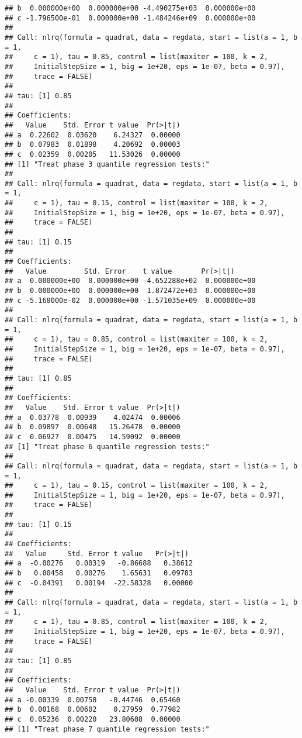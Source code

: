 \documentclass[
]{article}
\begin{document}
\begin{verbatim}
## b  0.000000e+00  0.000000e+00 -4.490275e+03  0.000000e+00
## c -1.796500e-01  0.000000e+00 -1.484246e+09  0.000000e+00
## 
## Call: nlrq(formula = quadrat, data = regdata, start = list(a = 1, b = 1, 
##     c = 1), tau = 0.85, control = list(maxiter = 100, k = 2, 
##     InitialStepSize = 1, big = 1e+20, eps = 1e-07, beta = 0.97), 
##     trace = FALSE)
## 
## tau: [1] 0.85
## 
## Coefficients:
##   Value    Std. Error t value  Pr(>|t|)
## a  0.22602  0.03620    6.24327  0.00000
## b  0.07983  0.01898    4.20692  0.00003
## c  0.02359  0.00205   11.53026  0.00000
## [1] "Treat phase 3 quantile regression tests:"
## 
## Call: nlrq(formula = quadrat, data = regdata, start = list(a = 1, b = 1, 
##     c = 1), tau = 0.15, control = list(maxiter = 100, k = 2, 
##     InitialStepSize = 1, big = 1e+20, eps = 1e-07, beta = 0.97), 
##     trace = FALSE)
## 
## tau: [1] 0.15
## 
## Coefficients:
##   Value         Std. Error    t value       Pr(>|t|)     
## a  0.000000e+00  0.000000e+00 -4.652288e+02  0.000000e+00
## b  0.000000e+00  0.000000e+00  1.872472e+03  0.000000e+00
## c -5.168000e-02  0.000000e+00 -1.571035e+09  0.000000e+00
## 
## Call: nlrq(formula = quadrat, data = regdata, start = list(a = 1, b = 1, 
##     c = 1), tau = 0.85, control = list(maxiter = 100, k = 2, 
##     InitialStepSize = 1, big = 1e+20, eps = 1e-07, beta = 0.97), 
##     trace = FALSE)
## 
## tau: [1] 0.85
## 
## Coefficients:
##   Value    Std. Error t value  Pr(>|t|)
## a  0.03778  0.00939    4.02474  0.00006
## b  0.09897  0.00648   15.26478  0.00000
## c  0.06927  0.00475   14.59092  0.00000
## [1] "Treat phase 6 quantile regression tests:"
## 
## Call: nlrq(formula = quadrat, data = regdata, start = list(a = 1, b = 1, 
##     c = 1), tau = 0.15, control = list(maxiter = 100, k = 2, 
##     InitialStepSize = 1, big = 1e+20, eps = 1e-07, beta = 0.97), 
##     trace = FALSE)
## 
## tau: [1] 0.15
## 
## Coefficients:
##   Value     Std. Error t value   Pr(>|t|) 
## a  -0.00276   0.00319   -0.86688   0.38612
## b   0.00458   0.00276    1.65631   0.09783
## c  -0.04391   0.00194  -22.58328   0.00000
## 
## Call: nlrq(formula = quadrat, data = regdata, start = list(a = 1, b = 1, 
##     c = 1), tau = 0.85, control = list(maxiter = 100, k = 2, 
##     InitialStepSize = 1, big = 1e+20, eps = 1e-07, beta = 0.97), 
##     trace = FALSE)
## 
## tau: [1] 0.85
## 
## Coefficients:
##   Value    Std. Error t value  Pr(>|t|)
## a -0.00339  0.00758   -0.44746  0.65460
## b  0.00168  0.00602    0.27959  0.77982
## c  0.05236  0.00220   23.80608  0.00000
## [1] "Treat phase 7 quantile regression tests:"

\end{verbatim}
\end{document}

